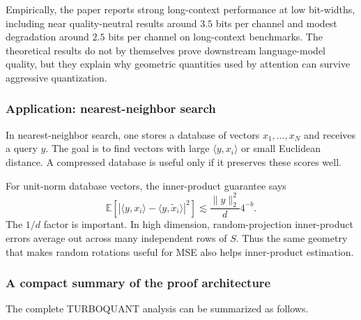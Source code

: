 Empirically, the paper reports strong long-context performance at low bit-widths, including near quality-neutral results around $3.5$ bits per channel and modest degradation around $2.5$ bits per channel on long-context benchmarks.
The theoretical results do not by themselves prove downstream language-model quality, but they explain why geometric quantities used by attention can survive aggressive quantization.

\subsubsection*{Application: nearest-neighbor search}

In nearest-neighbor search, one stores a database of vectors $x_1,\dots,x_N$ and receives a query $y$.
The goal is to find vectors with large $\langle y,x_i\rangle$ or small Euclidean distance.
A compressed database is useful only if it preserves these scores well.

For unit-norm database vectors, the inner-product guarantee says
\begin{equation}
    \mathbb E\left[
        \left|\langle y,x_i\rangle-
        \langle y,\widetilde x_i\rangle\right|^2
    \right]
    \lesssim
    \frac{\|y\|_2^2}{d}4^{-b}.
\end{equation}
The $1/d$ factor is important.
In high dimension, random-projection inner-product errors average out across many independent rows of $S$.
Thus the same geometry that makes random rotations useful for MSE also helps inner-product estimation.

\subsubsection*{A compact summary of the proof architecture}

The complete TURBOQUANT analysis can be summarized as follows.

